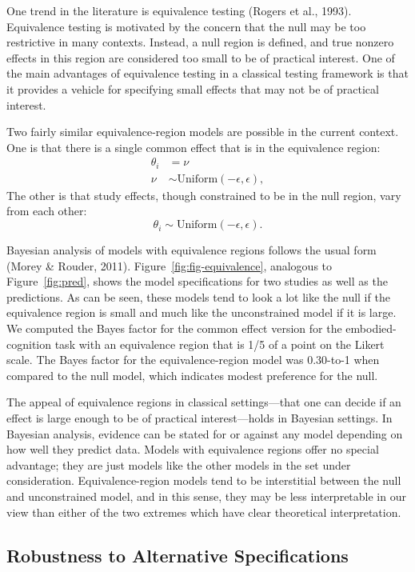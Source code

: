 \documentclass[english,man]{apa6}
\theoremstyle{definition}
\theoremstyle{definition}
\theoremstyle{definition}
\theoremstyle{remark}
\begin{document}
One trend in the literature is equivalence testing (Rogers et al.,
1993). Equivalence testing is motivated by the concern that the null may
be too restrictive in many contexts. Instead, a null region is defined,
and true nonzero effects in this region are considered too small to be
of practical interest. One of the main advantages of equivalence testing
in a classical testing framework is that it provides a vehicle for
specifying small effects that may not be of practical interest.

Two fairly similar equivalence-region models are possible in the current
context. One is that there is a single common effect that is in the
equivalence region:\\
\[
\begin{aligned}
\theta_i &= \nu\\
\nu &\sim \mbox{Uniform}(-\epsilon,\epsilon),
\end{aligned}
\] The other is that study effects, though constrained to be in the null
region, vary from each other: \[
\theta_i \sim \mbox{Uniform}(-\epsilon,\epsilon).
\]

Bayesian analysis of models with equivalence regions follows the usual
form (Morey \& Rouder, 2011). Figure~\ref{fig:fig-equivalence},
analogous to Figure~\ref{fig:pred}, shows the model specifications for
two studies as well as the predictions. As can be seen, these models
tend to look a lot like the null if the equivalence region is small and
much like the unconstrained model if it is large. We computed the Bayes
factor for the common effect version for the embodied-cognition task
with an equivalence region that is 1/5 of a point on the Likert scale.
The Bayes factor for the equivalence-region model was 0.30-to-1 when
compared to the null model, which indicates modest preference for the
null.

The appeal of equivalence regions in classical settings---that one can
decide if an effect is large enough to be of practical interest---holds
in Bayesian settings. In Bayesian analysis, evidence can be stated for
or against any model depending on how well they predict data. Models
with equivalence regions offer no special advantage; they are just
models like the other models in the set under consideration.
Equivalence-region models tend to be interstitial between the null and
unconstrained model, and in this sense, they may be less interpretable
in our view than either of the two extremes which have clear theoretical
interpretation.

\subsection{Robustness to Alternative
Specifications}\label{robustness-to-alternative-specifications}
\end{document}
